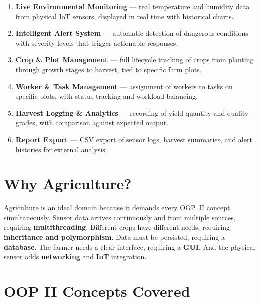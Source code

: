 \documentclass[12pt, a4paper]{report}
\begin{document}
\begin{enumerate}[leftmargin=*, label=\textbf{\arabic*.}]
    \item \textbf{Live Environmental Monitoring} --- real temperature and humidity data from physical IoT sensors, displayed in real time with historical charts.
    \item \textbf{Intelligent Alert System} --- automatic detection of dangerous conditions with severity levels that trigger actionable responses.
    \item \textbf{Crop \& Plot Management} --- full lifecycle tracking of crops from planting through growth stages to harvest, tied to specific farm plots.
    \item \textbf{Worker \& Task Management} --- assignment of workers to tasks on specific plots, with status tracking and workload balancing.
    \item \textbf{Harvest Logging \& Analytics} --- recording of yield quantity and quality grades, with comparison against expected output.
    \item \textbf{Report Export} --- CSV export of sensor logs, harvest summaries, and alert histories for external analysis.
\end{enumerate}

\section{Why Agriculture?}

Agriculture is an ideal domain because it demands every OOP~II concept simultaneously. Sensor data arrives continuously and from multiple sources, requiring \textbf{multithreading}. Different crops have different needs, requiring \textbf{inheritance and polymorphism}. Data must be persisted, requiring a \textbf{database}. The farmer needs a clear interface, requiring a \textbf{GUI}. And the physical sensor adds \textbf{networking} and \textbf{IoT} integration.

\section{OOP II Concepts Covered}
\end{document}
